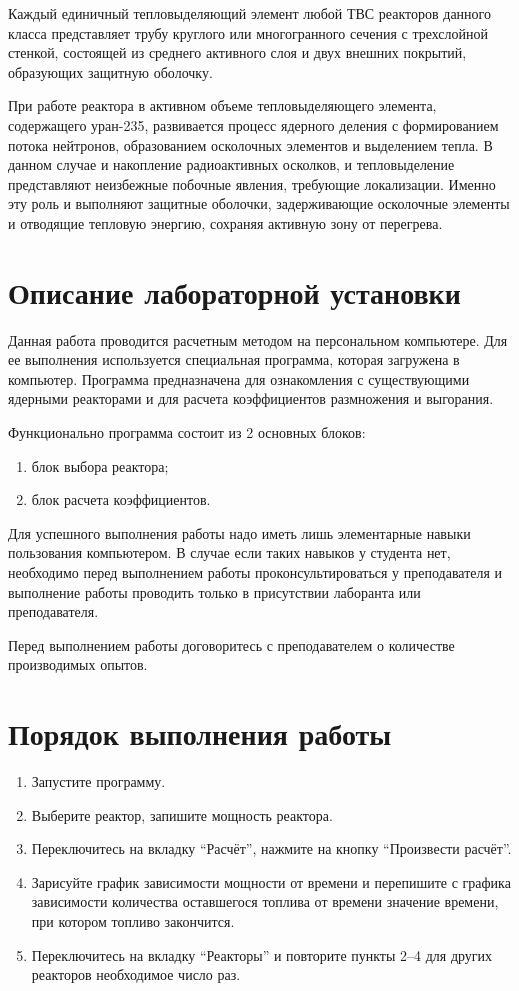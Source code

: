 Каждый единичный тепловыделяющий элемент любой ТВС реакторов данного класса
представляет трубу круглого или многогранного сечения с трехслойной стенкой,
состоящей из среднего активного слоя и двух внешних покрытий, образующих
защитную оболочку.

При работе реактора в активном объеме тепловыделяющего элемента, содержащего
уран-235, развивается процесс ядерного деления с формированием потока нейтронов,
образованием осколочных элементов и выделением тепла. В данном случае и
накопление радиоактивных осколков, и тепловыделение представляют неизбежные
побочные явления, требующие локализации. Именно эту роль и выполняют защитные
оболочки, задерживающие осколочные элементы и отводящие тепловую энергию,
сохраняя активную зону от перегрева.

\section{Описание лабораторной установки}

Данная работа проводится расчетным методом на персональном компьютере. Для ее
выполнения используется специальная программа, которая загружена в компьютер.
Программа предназначена для ознакомления с существующими ядерными реакторами и
для расчета коэффициентов размножения и выгорания.

Функционально программа состоит из 2 основных блоков:
\begin{enumerate}
    \item блок выбора реактора;
    \item блок расчета коэффициентов.
\end{enumerate}

Для успешного выполнения работы надо иметь лишь элементарные навыки пользования
компьютером. В случае если таких навыков у студента нет, необходимо перед
выполнением работы проконсультироваться у преподавателя и выполнение работы
проводить только в присутствии лаборанта или преподавателя.

Перед выполнением работы договоритесь с преподавателем о количестве
производимых опытов.

\section{Порядок выполнения работы}

\begin{enumerate}
    \item Запустите программу.
    \item Выберите реактор, запишите мощность реактора.
    \item Переключитесь на вкладку ``Расчёт'', нажмите на кнопку ``Произвести
    расчёт''.
    \item Зарисуйте график зависимости мощности от времени и перепишите с
    графика зависимости количества оставшегося топлива от времени значение
    времени, при котором топливо закончится.
    \item Переключитесь на вкладку ``Реакторы'' и повторите пункты 2--4 для
    других реакторов необходимое число раз.
\end{enumerate}

